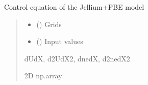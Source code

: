 \documentclass[letterpaper,10pt,english]{sphinxmanual}
\begin{document}
\begin{fulllineitems}
\label{\detokenize{fcdft.jellium:fcdft.jellium.jellium.fun}}
\pysigstartsignatures
\pysiglinewithargsret
{}
{\sphinxparamcomma {}}
{}
\pysigstopsignatures
\sphinxAtStartPar
Control equation of the Jellium+PBE model
\begin{quote}\begin{description}
\begin{itemize}
\item {} 
\sphinxAtStartPar
{} () \textendash{} Grids

\item {} 
\sphinxAtStartPar
{} () \textendash{} Input values

\end{itemize}

\sphinxAtStartPar
dUdX, d2UdX2, dnedX, d2nedX2

\sphinxAtStartPar
2D np.array

\end{description}\end{quote}

\end{fulllineitems}

\end{document}
